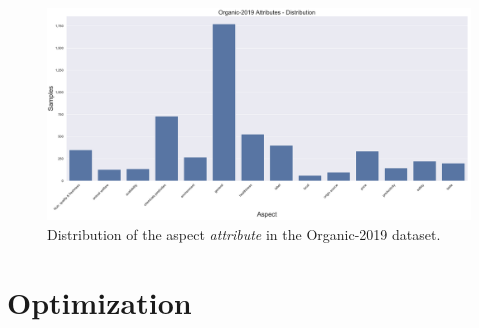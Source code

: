 \begin{figure}[ht]
	\centering
	\includegraphics[width=\textwidth]{figures/05_setup/05_organicAttributes}
	\caption{Distribution of the aspect \textit{attribute} in the Organic-2019 dataset.}
	\label{fig:05_organic2019_Attributes}
\end{figure}

	

\section{Optimization}

